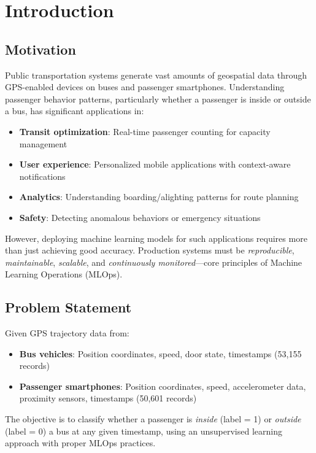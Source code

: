 \section{Introduction}

\subsection{Motivation}

Public transportation systems generate vast amounts of geospatial data through GPS-enabled devices on buses and passenger smartphones. Understanding passenger behavior patterns, particularly whether a passenger is inside or outside a bus, has significant applications in:

\begin{itemize}
    \item \textbf{Transit optimization}: Real-time passenger counting for capacity management
    \item \textbf{User experience}: Personalized mobile applications with context-aware notifications
    \item \textbf{Analytics}: Understanding boarding/alighting patterns for route planning
    \item \textbf{Safety}: Detecting anomalous behaviors or emergency situations
\end{itemize}

However, deploying machine learning models for such applications requires more than just achieving good accuracy. Production systems must be \textit{reproducible}, \textit{maintainable}, \textit{scalable}, and \textit{continuously monitored}—core principles of Machine Learning Operations (MLOps).

\subsection{Problem Statement}

Given GPS trajectory data from:
\begin{itemize}
    \item \textbf{Bus vehicles}: Position coordinates, speed, door state, timestamps (53,155 records)
    \item \textbf{Passenger smartphones}: Position coordinates, speed, accelerometer data, proximity sensors, timestamps (50,601 records)
\end{itemize}

The objective is to classify whether a passenger is \textit{inside} (label = 1) or \textit{outside} (label = 0) a bus at any given timestamp, using an unsupervised learning approach with proper MLOps practices.

